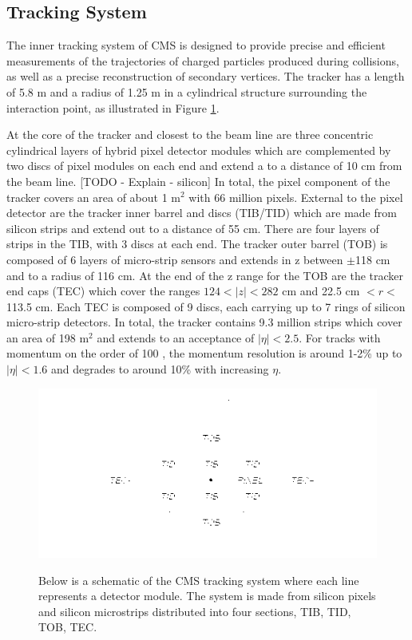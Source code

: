  \subsection{Tracking System}
The inner tracking system of CMS is designed to provide
 precise and efficient measurements of the trajectories
 of charged particles produced during collisions,
 as well as a precise reconstruction of secondary vertices.
The tracker has a length of 5.8 m and a radius of
 1.25 m in a cylindrical structure surrounding the 
 interaction point, as illustrated in Figure \ref{fig:tracker}.

At the core of the tracker and closest to the beam line
 are three concentric cylindrical layers %
 of hybrid pixel detector modules which are complemented
 by two discs of pixel modules on each end
 and extend a to a distance of 10 cm from the beam line.
[TODO - Explain - silicon]
In total, the pixel component of the tracker covers
 an area of about 1 m$^2$ with 66 million pixels.
External to the pixel detector are the tracker inner barrel and discs (TIB/TID)
 which are made from silicon strips and extend 
 out to a distance of 55 cm.
There are four layers of strips in the TIB, with 3 discs at each end.
The tracker outer barrel (TOB) is composed of
 6 layers of micro-strip sensors and extends
 in z between $\pm$118 cm and to a radius of 116 cm.
At the end of the z range for the TOB are the
 tracker end caps (TEC) which cover the ranges
 $124<|z|<282$ cm and 22.5 cm $<r<$113.5 cm.
Each TEC is composed of 9 discs,
 each carrying up to 7 rings of silicon micro-strip detectors.
In total, the tracker contains 9.3 million strips
 which cover an area of 198 m$^2$ and extends
 to an acceptance of $|\eta|<2.5$.
For tracks with momentum on the order of 100 \GeV,
 the momentum resolution is around 1-2\% up to $|\eta|<1.6$
 and degrades to around 10\% with increasing $\eta$.

\begin{figure}[tb]
\caption[The CMS Tracking System]{
 Below is a schematic of the CMS tracking system
  where each line represents a detector module.
 The system is made from silicon pixels and
  silicon microstrips distributed into four sections,
  TIB, TID, TOB, TEC.
 }
\includegraphics[width=\textwidth]{pdfs/experiment/cms_tracker.pdf}
\label{fig:tracker}
\end{figure}
 

